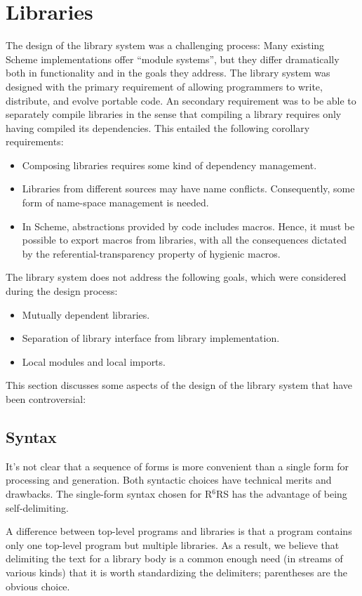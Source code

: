 \documentclass[twoside,twocolumn]{algol60}
\newcommand{\rn}[1]{R$^{#1}$RS}
\begin{document}
\chapter{Libraries}

The design of the library system was a challenging process: Many
existing Scheme implementations offer ``module systems'', but they
differ dramatically both in functionality and in the goals they
address.  The library system was designed with the primary
requirement of allowing programmers to write, distribute, and evolve
portable code.  An secondary requirement was to be able to separately
compile libraries in the sense that compiling a library requires only
having compiled its dependencies.  This entailed the following
corollary requirements:
%
\begin{itemize}
\item Composing libraries requires some kind of dependency management.
\item Libraries from different sources may have name conflicts.
  Consequently, some form of name-space management is needed.
\item In Scheme, abstractions provided by code includes macros.
  Hence, it must be possible to export macros from libraries, with all
  the consequences dictated by the referential-transparency property
  of hygienic macros.
\end{itemize}
%
The library system does not address the following goals, which were
considered during the design process:
%
\begin{itemize}
\item Mutually dependent libraries.
\item Separation of library interface from library implementation.
\item Local modules and local imports. 
\end{itemize}
%
This section discusses some aspects of the design of the library
system that have been controversial:

\section{Syntax}

It's not clear that a sequence of forms is more convenient than a
single form for processing and generation. Both syntactic choices have
technical merits and drawbacks. The single-form syntax chosen for
\rn{6} has the advantage of being self-delimiting.

A difference between top-level programs and libraries is that a
program contains only one top-level program but multiple libraries.
As a result, we believe that delimiting the text for a library body is
a common enough need (in streams of various kinds) that it is worth
standardizing the delimiters; parentheses are the obvious choice.
\end{document}
